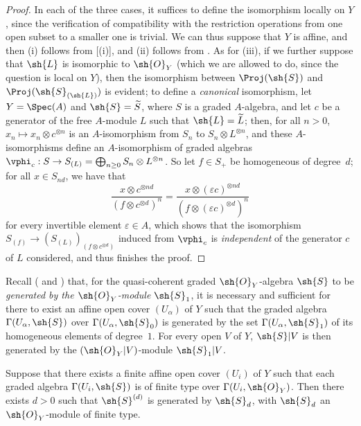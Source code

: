 \begin{proof}
In each of the three cases, it suffices to define the isomorphism locally on $Y$, since the verification of compatibility with the restriction operations from one open subset to a smaller one is trivial.
We can thus suppose that $Y$ is affine, and then (i) follows from [(i)], and (ii) follows from .
As for (iii), if we further suppose that $\sh{L}$ is isomorphic to $\sh{O}_Y$ (which we are allowed to do, since the question is local on $Y$), then the isomorphism between $\Proj(\sh{S})$ and $\Proj(\sh{S}_{(\sh{L})})$ is evident;
to define a \emph{canonical} isomorphism, let $Y=\Spec(A)$ and $\sh{S}=\widetilde{S}$, where $S$ is a graded $A$-algebra, and let $c$ be a generator of the free $A$-module $L$ such that $\sh{L}=\widetilde{L}$;
then, for all $n>0$, $x_n\mapsto x_n\otimes c^{\otimes n}$ is an $A$-isomorphism from $S_n$ to $S_n\otimes L^{\otimes n}$, and these $A$-isomorphisms define an $A$-isomorphism of graded algebras $\vphi_c:S\to S_{(L)}=\bigoplus_{n\geq0}S_n\otimes L^{\otimes n}$.
So let $f\in S_+$ be homogeneous of degree~$d$;
for all $x\in S_{nd}$, we have that
\[
  \frac{x\otimes c^{\otimes nd}}{(f\otimes c^{\otimes d})^n}
  =
  \frac{x\otimes(\varepsilon c)^{\otimes nd}}{(f\otimes(\varepsilon c)^{\otimes d})^n}
\]
for every invertible element $\varepsilon\in A$, which shows that the isomorphism $S_{(f)}\to(S_{(L)})_{(f\otimes c^{\otimes d})}$ induced from $\vphi_c$ is \emph{independent} of the generator $c$ of $L$ considered, and thus finishes the proof.
\end{proof}

\begin{env}[3.1.9]
\label{II.3.1.9}
Recall ( and ) that, for the quasi-coherent graded $\sh{O}_Y$-algebra $\sh{S}$ to be \emph{generated by the $\sh{O}_Y$-module $\sh{S}_1$}, it is necessary and sufficient for there to exist an affine open cover $(U_\alpha)$ of $Y$ such that the graded algebra $\Gamma(U_\alpha,\sh{S})$ over $\Gamma(U_\alpha,\sh{S}_0)$ is generated by the set $\Gamma(U_\alpha,\sh{S}_1)$ of its homogeneous elements of degree~$1$.
For every open $V$ of $Y$, $\sh{S}|V$ is then generated by the $(\sh{O}_Y|V)$-module $\sh{S}_1|V$.
\end{env}

\begin{proposition}[3.1.10]
\label{II.3.1.10}
Suppose that there exists a finite affine open cover $(U_i)$ of $Y$ such that each graded algebra $\Gamma(U_i,\sh{S})$ is of finite type over $\Gamma(U_i,\sh{O}_Y)$.
Then there exists $d>0$ such that $\sh{S}^{(d)}$ is generated by $\sh{S}_d$, with $\sh{S}_d$ an $\sh{O}_Y$-module of finite type.
\end{proposition}

